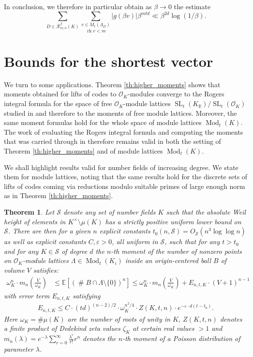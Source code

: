 \documentclass{amsart}
\newtheorem{theorem}{Theorem}
\newcommand{\calO}{\mathcal{O}}
\newcommand{\OK}{\mathcal{O}_K}
\newcommand{\KR}{K_\mathbb{R}}
\DeclareMathOperator{\SL}{SL}
\DeclareMathOperator{\ML}{Mod}
\DeclareMathOperator{\card}{\texttt{\#}}
\DeclareMathOperator{\rank}{rk}
\begin{document}
In conclusion, we therefore in particular obtain as $\beta\rightarrow0$ the estimate
$$	\sum_{D\in\mathcal{R}_{m,n}^{\beta}(K)}\underset{\rank v<m}{\sum_{v\in M_t(\Lambda_D)}}|g(\beta v)|\beta^{mtd}\ll\beta^{2d}\log(1/\beta).$$

 \section{Bounds for the shortest vector}
\label{se:bounds_for_vectors}
 
We turn to some applications. Theorem \ref{th:higher_moments} shows that moments obtained for lifts of codes to $\OK$-modules converge to the Rogers integral formula for the space of free $\OK$-module lattices $\SL_{t}(\KR)/\SL_{t}(\OK)$ studied in \cite{GSV23} and therefore to the moments of free module lattices. Moreover, the same moment formulas hold for the whole space of module lattices $\ML_{t}(K)$. The work of evaluating the Rogers integral formula and computing the moments that was carried through in \cite{GSV23} therefore remains valid in both the setting of Theorem \ref{th:higher_moments} and of module lattices $\ML_{t}(K)$. \par
We shall highlight results valid for number fields of increasing degree. We state them for module lattices, noting that the same results hold for the discrete sets of lifts of codes coming via reductions modulo suitable primes of large enough norm as in Theorem \ref{th:higher_moments}.
\begin{theorem}\label{thm:mainGSV}
		Let $\mathcal{S}$ denote any set of number fields $K$ such that the absolute Weil height of elements in $K^\times\setminus\mu(K)$ has a strictly positive uniform lower bound on $\mathcal{S}$. There are then for a given $n$ explicit constants $t_0(n,\mathcal{S})=O_\mathcal{S}(n^3\log\log n)$ as well as explicit constants $C,\varepsilon>0$, all uniform in $\mathcal{S}$, 
		such that for any $t> t_0$ and for any $K\in\mathcal{S}$ of degree $d$ the $n$-th moment of the number of nonzero points on $\calO_K$-module lattices $\Lambda\in \ML_{t}(K_i)$ inside an origin-centered ball $B$ of volume $V$ satisfies:
		\begin{align}
			\label{eq:small_error_from_poisson}
			\omega_K^n  \cdot m_n( \tfrac{V}{\omega_{ K} } )
	       &\leq \mathbb{E}[\left( \card B \cap \Lambda \setminus \{0\}\right)^n]
	       \le 
	       \omega_K^n\cdot  m_n( \tfrac{V}{\omega_{ K }} )
	       + E_{n,t,K} \cdot (V+1)^{n-1}
		\end{align}
		with error term $E_{n,t,K}$ satisfying
		\begin{align}
			E_{n,t,K} \le 
	       C \cdot (td)^{(n-2)/2}\cdot \omega_K^{n^2/4}\cdot Z(K,t,n)\cdot e^{-\varepsilon \cdot d(t-t_0)} .
		\end{align}
		Here $\omega_{K}=\# \mu(K) $ are the number of roots of unity in $K$, $ Z(K,t,n)$ denotes a finite product of Dedekind zeta values $\zeta_{K}$ at certain real values $>1$ and 
		$m_n(\lambda)=e^{-\lambda}\sum_{r=0}^\infty\frac{\lambda^{r}}{r!} r^{n}  $ denotes the $n$-th moment of a Poisson distribution of parameter $\lambda$.
	\end{theorem}
\end{document}
